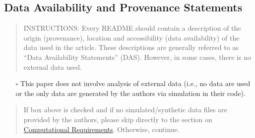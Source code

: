 \documentclass[
]{article}
\providecommand{\tightlist}{%
  \setlength{\itemsep}{0pt}\setlength{\parskip}{0pt}}
\begin{document}
\hypertarget{data-availability-and-provenance-statements}{%
\subsection{Data Availability and Provenance
Statements}\label{data-availability-and-provenance-statements}}

\begin{quote}
INSTRUCTIONS: Every README should contain a description of the origin
(provenance), location and accessibility (data availability) of the data
used in the article. These descriptions are generally referred to as
``Data Availability Statements'' (DAS). However, in some cases, there is
no external data used.
\end{quote}

\begin{itemize}
\tightlist
\item[$\square$]
  This paper does not involve analysis of external data (i.e., no data
  are used or the only data are generated by the authors via simulation
  in their code).
\end{itemize}

\begin{quote}
If box above is checked and if no simulated/synthetic data files are
provided by the authors, please skip directly to the section on
\protect\hyperlink{computational-requirements}{Computational
Requirements}. Otherwise, continue.
\end{quote}
\end{document}
